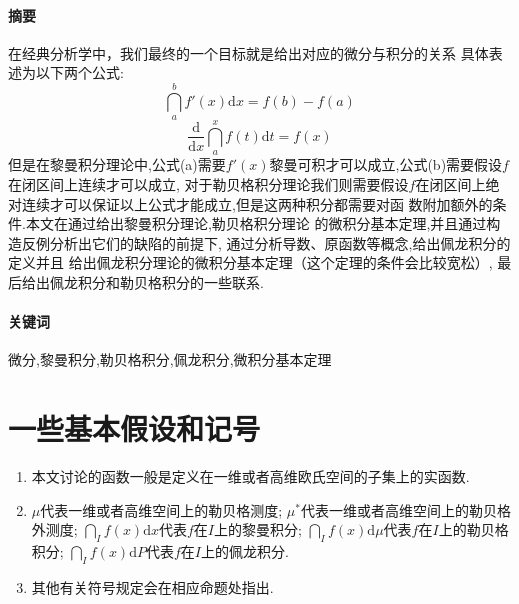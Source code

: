 \documentclass[a4paper,12pt]{article}
\title{\heiti{微分与积分的关系\\\large{\qquad\qquad\qquad——在不同积分论背景下}}}
\date{}
\begin{document}
    {
        \maketitle
        \paragraph{摘要}在经典分析学中，我们最终的一个目标就是给出对应的微分与积分的关系
        具体表述为以下两个公式:
        \begin{equation}
            \dint\limits_a^bf'(x)\mathrm{d}x=f(b)-f(a)\tag{a}
        \end{equation}
        \begin{equation}
            \dfrac{\mathrm{d}}{\mathrm{d}x}\dint\limits_a^xf(t)\mathrm{d}t=f(x)\tag{b}
        \end{equation}
        但是在黎曼积分理论中,公式(a)需要$f'(x)$黎曼可积才可以成立,公式(b)需要假设$f$在闭区间上连续才可以成立,
        对于勒贝格积分理论我们则需要假设$f$在闭区间上绝对连续才可以保证以上公式才能成立,但是这两种积分都需要对函
        数附加额外的条件.本文在通过给出黎曼积分理论,勒贝格积分理论
        的微积分基本定理,并且通过构造反例分析出它们的缺陷的前提下,
        通过分析导数、原函数等概念,给出佩龙积分的定义并且
        给出佩龙积分理论的微积分基本定理（这个定理的条件会比较宽松）,
        最后给出佩龙积分和勒贝格积分的一些联系.

        \paragraph{关键词}微分,黎曼积分,勒贝格积分,佩龙积分,微积分基本定理

        \newpage
        \tableofcontents

        \newpage

        \section*{一些基本假设和记号}
        \begin{enumerate}
            \item 本文讨论的函数一般是定义在一维或者高维欧氏空间的子集上的实函数.
            \item\subitem $\mu$代表一维或者高维空间上的勒贝格测度;
            \subitem $\mu^*$代表一维或者高维空间上的勒贝格外测度;
            \subitem $\dint_If(x)\mathrm{d}x$代表$f$在$I$上的黎曼积分;
            \subitem $\dint_If(x)\mathrm{d}\mu$代表$f$在$I$上的勒贝格积分;
            \subitem $\dint_If(x)\mathrm{d}P$代表$f$在$I$上的佩龙积分.
            \item 其他有关符号规定会在相应命题处指出.
        \end{enumerate}
        \newpage
}
\end{document}
